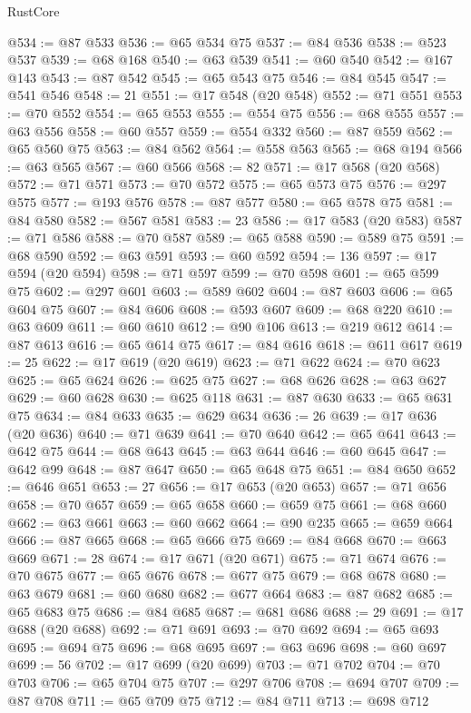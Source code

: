 \begin{lexlean}{RustCore}
\begin{coremodule}
@534 := @87 @533
@536 := @65 @534 @75
@537 := @84 @536
@538 := @523 @537
@539 := @68 @168
@540 := @63 @539
@541 := @60 @540
@542 := @167 @143
@543 := @87 @542
@545 := @65 @543 @75
@546 := @84 @545
@547 := @541 @546
@548 := 21
@551 := @17 @548 (@20 @548)
@552 := @71 @551
@553 := @70 @552
@554 := @65 @553
@555 := @554 @75
@556 := @68 @555
@557 := @63 @556
@558 := @60 @557
@559 := @554 @332
@560 := @87 @559
@562 := @65 @560 @75
@563 := @84 @562
@564 := @558 @563
@565 := @68 @194
@566 := @63 @565
@567 := @60 @566
@568 := 82
@571 := @17 @568 (@20 @568)
@572 := @71 @571
@573 := @70 @572
@575 := @65 @573 @75
@576 := @297 @575
@577 := @193 @576
@578 := @87 @577
@580 := @65 @578 @75
@581 := @84 @580
@582 := @567 @581
@583 := 23
@586 := @17 @583 (@20 @583)
@587 := @71 @586
@588 := @70 @587
@589 := @65 @588
@590 := @589 @75
@591 := @68 @590
@592 := @63 @591
@593 := @60 @592
@594 := 136
@597 := @17 @594 (@20 @594)
@598 := @71 @597
@599 := @70 @598
@601 := @65 @599 @75
@602 := @297 @601
@603 := @589 @602
@604 := @87 @603
@606 := @65 @604 @75
@607 := @84 @606
@608 := @593 @607
@609 := @68 @220
@610 := @63 @609
@611 := @60 @610
@612 := @90 @106
@613 := @219 @612
@614 := @87 @613
@616 := @65 @614 @75
@617 := @84 @616
@618 := @611 @617
@619 := 25
@622 := @17 @619 (@20 @619)
@623 := @71 @622
@624 := @70 @623
@625 := @65 @624
@626 := @625 @75
@627 := @68 @626
@628 := @63 @627
@629 := @60 @628
@630 := @625 @118
@631 := @87 @630
@633 := @65 @631 @75
@634 := @84 @633
@635 := @629 @634
@636 := 26
@639 := @17 @636 (@20 @636)
@640 := @71 @639
@641 := @70 @640
@642 := @65 @641
@643 := @642 @75
@644 := @68 @643
@645 := @63 @644
@646 := @60 @645
@647 := @642 @99
@648 := @87 @647
@650 := @65 @648 @75
@651 := @84 @650
@652 := @646 @651
@653 := 27
@656 := @17 @653 (@20 @653)
@657 := @71 @656
@658 := @70 @657
@659 := @65 @658
@660 := @659 @75
@661 := @68 @660
@662 := @63 @661
@663 := @60 @662
@664 := @90 @235
@665 := @659 @664
@666 := @87 @665
@668 := @65 @666 @75
@669 := @84 @668
@670 := @663 @669
@671 := 28
@674 := @17 @671 (@20 @671)
@675 := @71 @674
@676 := @70 @675
@677 := @65 @676
@678 := @677 @75
@679 := @68 @678
@680 := @63 @679
@681 := @60 @680
@682 := @677 @664
@683 := @87 @682
@685 := @65 @683 @75
@686 := @84 @685
@687 := @681 @686
@688 := 29
@691 := @17 @688 (@20 @688)
@692 := @71 @691
@693 := @70 @692
@694 := @65 @693
@695 := @694 @75
@696 := @68 @695
@697 := @63 @696
@698 := @60 @697
@699 := 56
@702 := @17 @699 (@20 @699)
@703 := @71 @702
@704 := @70 @703
@706 := @65 @704 @75
@707 := @297 @706
@708 := @694 @707
@709 := @87 @708
@711 := @65 @709 @75
@712 := @84 @711
@713 := @698 @712

\end{coremodule}
\end{lexlean}

